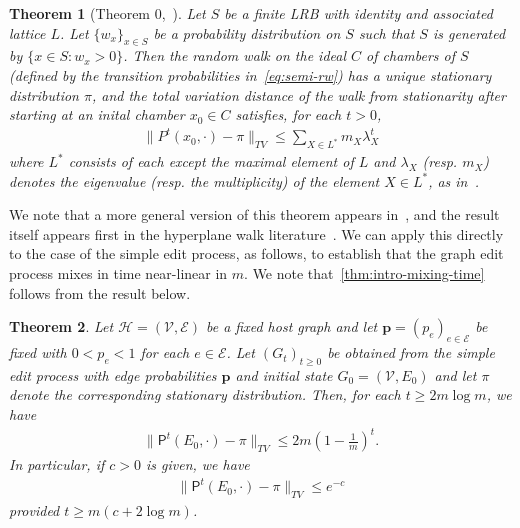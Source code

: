 \documentclass[11pt,a4paper]{article}
\newtheorem{theorem}{Theorem}[section]
\begin{document}
\begin{theorem}[Theorem 0,~\cite{brownSemigroupsRingsMarkov2000}]\label{thm:convergence-brown}
    Let $S$ be a finite LRB with identity and associated lattice $L$. Let $\{w_x\}_{x\in S}$ be a probability distribution on $S$ such that $S$ is generated by $\{x\in S: w_x>0\}$. Then the random walk on the ideal $C$ of chambers of $S$ (defined by the transition probabilities in~\cref{eq:semi-rw}) has a unique stationary distribution $\pi$, and the total variation distance of the walk from stationarity after starting at an inital chamber $x_0\in C$ satisfies, for each $t>0$,
        \begin{align*}
            \|P^t(x_0, \cdot) - \pi\|_{TV} \leq \sum_{X\in L^\ast} m_X\lambda_X^t
        \end{align*}
    where $L^\ast$ consists of each except the maximal element of $L$ and $\lambda_X$ (resp. $m_X$) denotes the eigenvalue (resp. the multiplicity) of the element $X\in L^\ast$, as in~\cite[Thm. 1]{brownSemigroupsRingsMarkov2000}.
\end{theorem}

We note that a more general version of this theorem appears in~\cite{bidigare1999combinatorial}, and the result itself appears first in the hyperplane walk literature~\cite{brown1998random}. We can apply this directly to the case of the simple edit process, as follows, to establish that the graph edit process mixes in time near-linear in $m$. We note that~\cref{thm:intro-mixing-time} follows from the result below.

\begin{theorem}\label{thm:mixing-time}
    Let $\mathcal{H} = (\mathcal{V},\mathcal{E})$ be a fixed host graph and let $\mathbf{p}=(p_e)_{e\in\mathcal{E}}$ be fixed with $0<p_e<1$ for each $e\in\mathcal{E}$. Let $(G_t)_{t\geq 0}$ be obtained from the simple edit process with edge probabilities $\mathbf{p}$ and initial state $G_0 = (\mathcal{V}, E_0)$ and let $\pi$ denote the corresponding stationary distribution. Then, for each $t\geq 2m\log{m}$, we have
        \begin{align}\label{eq:mixing-time-1}
            \|\mathsf{P}^t(E_0, \cdot) - \pi\|_{TV}\leq 2m\left(1-\frac{1}{m}\right)^t.
        \end{align}
    In particular, if $c>0$ is given, we have
        \begin{align*}
            \|\mathsf{P}^t(E_0, \cdot) - \pi\|_{TV}\leq e^{-c}
        \end{align*}
    provided $t\geq m(c+2\log{m})$.
\end{theorem}
\end{document}
